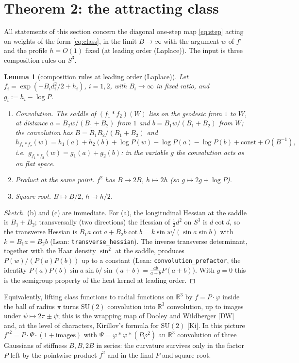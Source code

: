 \documentclass[11pt,a4paper]{article}
\newtheorem{lemma}{Lemma}[section]
\theoremstyle{definition}
\theoremstyle{remark}
\newcommand{\R}{\mathbb{R}}
\newcommand{\SU}{\mathrm{SU}(2)}
\newcommand{\code}[1]{\texttt{#1}}
\begin{document}
\section{Theorem 2: the attracting class}\label{sec:thm2}

All statements of this section concern the diagonal one-step map \eqref{eq:step} acting on weights of the form \eqref{eq:class}, in the limit $B\to\infty$ with the argument $w$ of $f'$ and the profile $h=O(1)$ fixed (at leading order (Laplace)).
The input is three composition rules on $S^3$.

\begin{lemma}[composition rules at leading order (Laplace)]\label{lem:rules}
Let $f_i=\exp(-B_id_i^2/2+h_i)$, $i=1,2$, with $B_i\to\infty$ in fixed ratio, and $g_i:=h_i-\log P$.
\begin{enumerate}[label=(\alph*)]
\item \emph{Convolution.} The saddle of $(f_1*f_2)(W)$ lies on the geodesic from $1$ to $W$, at distance $a=B_2w/(B_1+B_2)$ from $1$ and $b=B_1w/(B_1+B_2)$ from $W$; the convolution has $B=B_1B_2/(B_1+B_2)$ and
\[
h_{f_1*f_2}(w)=h_1(a)+h_2(b)+\log P(w)-\log P(a)-\log P(b)+\mathrm{const}+O(B^{-1}),
\]
i.e.\ $g_{f_1*f_2}(w)=g_1(a)+g_2(b)$: in the variable $g$ the convolution acts as on flat space.
\item \emph{Product at the same point.} $f^2$ has $B\mapsto2B$, $h\mapsto2h$ (so $g\mapsto2g+\log P$).
\item \emph{Square root.} $B\mapsto B/2$, $h\mapsto h/2$.
\end{enumerate}
\end{lemma}

\begin{proof}[Sketch]
(b) and (c) are immediate.
For (a), the longitudinal Hessian at the saddle is $B_1+B_2$; transversally (two directions) the Hessian of $\tfrac12d^2$ on $S^3$ is $d\cot d$, so the transverse Hessian is $B_1a\cot a+B_2b\cot b=k\sin w/(\sin a\sin b)$ with $k=B_1a=B_2b$ (Lean: \code{transverse\_hessian}).
The inverse transverse determinant, together with the Haar density $\sin^2$ at the saddle, produces $P(w)/(P(a)P(b))$ up to a constant (Lean: \code{convolution\_prefactor}, the identity $P(a)P(b)\sin a\sin b/\sin(a+b)=\frac{ab}{a+b}P(a+b)$).
With $g=0$ this is the semigroup property of the heat kernel at leading order.
\end{proof}

Equivalently, lifting class functions to radial functions on $\R^3$ by $f=P\cdot\varphi$ inside the ball of radius $\pi$ turns $\SU$ convolution into $\R^3$ convolution, up to images under $\psi\mapsto2\pi\pm\psi$; this is the wrapping map of Dooley and Wildberger [DW] and, at the level of characters, Kirillov's formula for $\SU$ [Ki].
In this picture $f'^2=P\cdot\Psi\cdot(1+\text{images})$ with $\Psi=\varphi*\varphi*(P\varphi^2)$ an $\R^3$ convolution of three Gaussians of stiffness $B,B,2B$ in series: the curvature survives only in the factor $P$ left by the pointwise product $f^2$ and in the final $P$ and square root.
\end{document}
